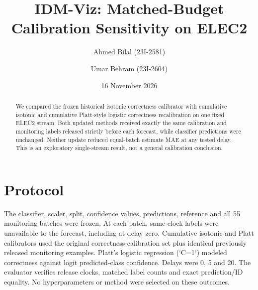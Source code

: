 \documentclass[10pt,a4paper]{article}
\title{IDM-Viz: Matched-Budget Calibration Sensitivity on ELEC2}
\author{Ahmed Bilal (23I-2581) \and Umar Behram (23I-2604)}\date{16 November 2026}
\begin{document}
\maketitle
\begin{abstract}
We compared the frozen historical isotonic correctness calibrator with cumulative isotonic and cumulative Platt-style logistic correctness recalibration on one fixed ELEC2 stream. Both updated methods received exactly the same calibration and monitoring labels released strictly before each forecast, while classifier predictions were unchanged. Neither update reduced equal-batch estimate MAE at any tested delay. This is an exploratory single-stream result, not a general calibration conclusion.
\end{abstract}
\section{Protocol}
The classifier, scaler, split, confidence values, predictions, reference and all 55 monitoring batches were frozen. At each batch, same-clock labels were unavailable to the forecast, including at delay zero. Cumulative isotonic and Platt calibrators used the original correctness-calibration set plus identical previously released monitoring examples. Platt's logistic regression (`C=1`) modeled correctness against logit predicted-class confidence. Delays were 0, 5 and 20. The evaluator verifies release clocks, matched label counts and exact prediction/ID equality. No hyperparameters or method were selected on these outcomes.
\end{document}
